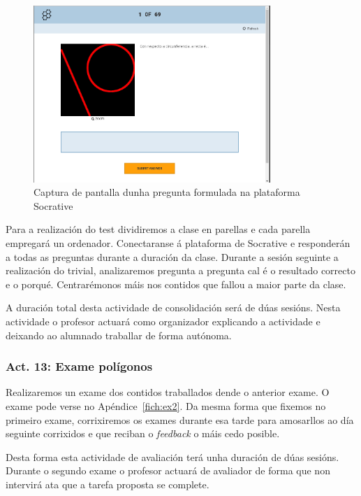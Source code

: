 \begin{figure}[h!]
  \centering
  \includegraphics[width=0.8\textwidth]{img/socrative.png}
  \caption{Captura de pantalla dunha pregunta formulada na plataforma Socrative}\label{fig:act13}
\end{figure}

Para a realización do test dividiremos a clase en parellas e cada parella empregará un ordenador. Conectaranse á plataforma de Socrative e responderán a todas as preguntas durante a duración da clase. Durante a sesión seguinte a realización do trivial, analizaremos pregunta a pregunta cal é o resultado correcto e o porqué. Centrarémonos máis nos contidos que fallou a maior parte da clase.

A duración total desta actividade de consolidación será de dúas sesións. Nesta actividade o profesor actuará como organizador explicando a actividade e deixando ao alumnado traballar de forma autónoma.

\subsubsection{Act. 13: Exame polígonos}\label{act:examen2}
Realizaremos un exame dos contidos traballados dende o anterior exame. O exame pode verse no Apéndice~\ref{fich:ex2}. Da mesma forma que fixemos no primeiro exame, corrixiremos os exames durante esa tarde para amosarllos ao día seguinte corrixidos e que reciban o \emph{feedback} o máis cedo posible.

Desta forma esta actividade de avaliación terá unha duración de dúas sesións. Durante o segundo exame o profesor actuará de avaliador de forma que non intervirá ata que a tarefa proposta se complete.
